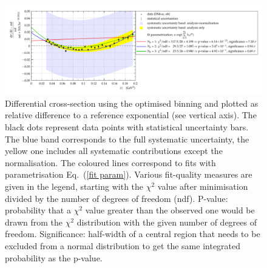 \begin{figure}[t]
\vskip-5mm
\begin{center}
\includegraphics[width=\textwidth]{fig/t_dist_rel_with_fits.pdf}
\vskip-6mm
\caption{%
Differential cross-section using the optimised binning and plotted as relative difference to a reference exponential (see vertical axis). The black dots represent data points with statistical uncertainty bars. The blue band corresponds to the full systematic uncertainty, the yellow one includes all systematic contributions except the normalisation. The coloured lines correspond to fits with parametrisation Eq.~(\ref{fit param}).
Various fit-quality measures are given in the legend, starting with the $\chi^2$ value after minimisation divided by the number of degrees of freedom (ndf). P-value: probability that a $\chi^2$ value greater than the observed one would be drawn from the $\chi^2$ distribution with the given number of degrees of freedom. Significance: half-width of a central region that needs to be excluded from a normal distribution to get the same integrated probability as the p-value.
}
\label{fig:data rel ob}
\end{center}
\vskip-2mm
\end{figure}



